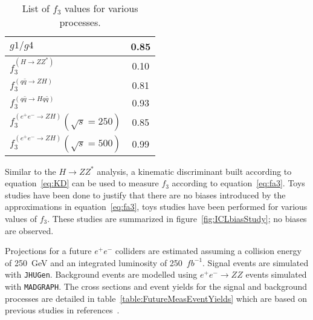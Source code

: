 \begin{table}
\begin{center}
\begin{tabular}{l|c}
\large $g1/g4$                   & 0.85  \vspace{.1cm} \\
\hline\hline                          
\large $f_3^{(H\to ZZ^*)}$          & 0.10  \vspace{.1cm} \\
\large $f_3^{(q\bar{q}\to ZH)}$      & 0.81  \vspace{.1cm} \\ 
\large $f_3^{(q\bar{q}\to Hq\bar{q})}$ & 0.93  \vspace{.1cm} \\
\large $f_3^{(e^+e^-\to ZH)}(\sqrt{s}=250)$ & 0.85   \vspace{.1cm} \\
\large $f_3^{(e^+e^-\to ZH)}(\sqrt{s}=500)$ & 0.99  \vspace{.1cm} \\
\hline
\hline
\end{tabular}
\end{center}
\label{table:fa3Conversion}
\caption{List of $f_3$ values for various processes.}
\end{table}

Similar to the $H\to ZZ^*$ analysis, a kinematic discriminant 
built according to equation~\ref{eq:KD} can be used to measure 
$f_3$ according to equation~\ref{eq:fa3}.  
Toys studies have been done to justify that there are no
biases introduced by the approximations in equation~\ref{eq:fa3},
toys studies have been performed for various values of 
$f_3$.  These studies are summarized in
figure~\ref{fig:ICLbiasStudy}; no biases are observed.  

\begin{figure}
\begin{center}
\end{center}
\caption{}
\label{fig:ILCbiasStudy}
\end{figure}

Projections for a future $e^+e^-$
colliders are estimated assuming a collision energy  
of 250~GeV and an integrated luminosity of 250~$fb^{-1}$.
Signal events are simulated with \verb+JHUGen+.  Background events
are modelled using $e^+e^-\to ZZ$ events simulated with
\verb+MADGRAPH+.  
The cross sections and event yields for the signal and
background processes are detailed in 
table~\ref{table:FutureMeasEventYields}
which are based on previous studies in references~\cite{???}.

